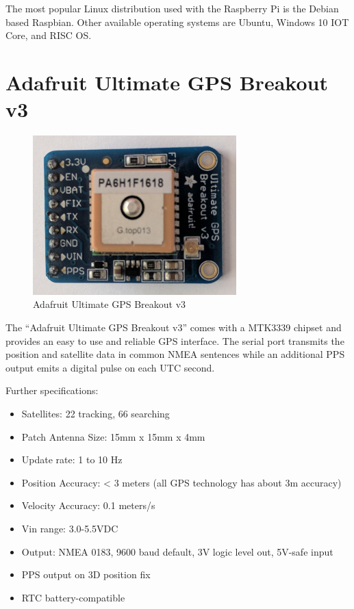 The most popular Linux distribution used with the Raspberry Pi is the Debian based Raspbian. Other available operating systems are Ubuntu, Windows 10 IOT Core, and RISC OS.

\section{Adafruit Ultimate GPS Breakout v3}

\begin{figure}[tb]
	\centering
	\includegraphics[width=0.7\textwidth]{figures/hw_gps.jpg}
	\caption{Adafruit Ultimate GPS Breakout v3}
	\label{fig:gps}
\end{figure}

The “Adafruit Ultimate GPS Breakout v3” comes with a MTK3339 chipset and provides an easy to use and reliable GPS interface. The serial port transmits the position and satellite data in common NMEA sentences while an additional PPS output emits a digital pulse on each UTC second.

Further specifications:
\begin{itemize}
\item Satellites: 22 tracking, 66 searching
\item Patch Antenna Size: 15mm x 15mm x 4mm
\item Update rate: 1 to 10 Hz
\item Position Accuracy: < 3 meters (all GPS technology has about 3m accuracy)
\item Velocity Accuracy: 0.1 meters/s
\item Vin range: 3.0-5.5VDC
\item Output: NMEA 0183, 9600 baud default, 3V logic level out, 5V-safe input
\item PPS output on 3D position fix
\item RTC battery-compatible
\end{itemize}

